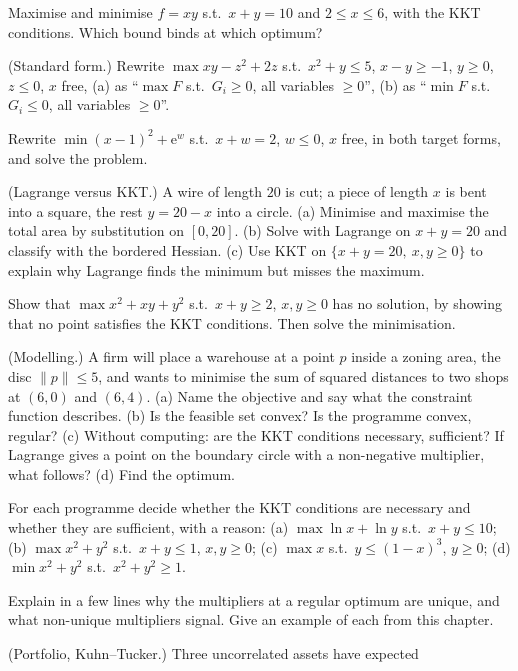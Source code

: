 \begin{problems}
  \item Maximise and minimise $f=xy$ s.t.\ $x+y=10$ and $2\le x\le6$, with
        the KKT conditions. Which bound binds at which optimum?
  \item (Standard form.) Rewrite
        $\max xy-z^{2}+2z$ s.t.\ $x^{2}+y\le5$, $x-y\ge-1$, $y\ge0$,
        $z\le0$, $x$ free, (a) as ``$\max F$ s.t.\ $G_i\ge0$, all variables
        $\ge0$'', (b) as ``$\min F$ s.t.\ $G_i\le0$, all variables $\ge0$''.
  \item Rewrite $\min(x-1)^{2}+\mathrm{e}^{w}$ s.t.\ $x+w=2$, $w\le0$, $x$
        free, in both target forms, and solve the problem.
  \item (Lagrange versus KKT.) A wire of length $20$ is cut; a piece of
        length $x$ is bent into a square, the rest $y=20-x$ into a circle.
        (a) Minimise and maximise the total area by substitution on
        $[0,20]$. (b) Solve with Lagrange on $x+y=20$ and classify with the
        bordered Hessian. (c) Use KKT on $\{x+y=20,\ x,y\ge0\}$ to explain
        why Lagrange finds the minimum but misses the maximum.
  \item Show that $\max x^{2}+xy+y^{2}$ s.t.\ $x+y\ge2$, $x,y\ge0$ has no
        solution, by showing that no point satisfies the KKT conditions.
        Then solve the minimisation.
  \item (Modelling.) A firm will place a warehouse at a point $p$ inside a
        zoning area, the disc $\|p\|\le5$, and wants to minimise the sum of
        squared distances to two shops at $(6,0)$ and $(6,4)$.
        (a) Name the objective and say what the constraint function
        describes. (b) Is the feasible set convex? Is the programme convex,
        regular? (c) Without computing: are the KKT conditions necessary,
        sufficient? If Lagrange gives a point on the boundary circle with a
        non-negative multiplier, what follows? (d) Find the optimum.
  \item For each programme decide whether the KKT conditions are necessary
        and whether they are sufficient, with a reason:
        (a) $\max\ln x+\ln y$ s.t.\ $x+y\le10$;
        (b) $\max x^{2}+y^{2}$ s.t.\ $x+y\le1$, $x,y\ge0$;
        (c) $\max x$ s.t.\ $y\le(1-x)^{3}$, $y\ge0$;
        (d) $\min x^{2}+y^{2}$ s.t.\ $x^{2}+y^{2}\ge1$.
  \item Explain in a few lines why the multipliers at a regular optimum are
        unique, and what non-unique multipliers signal. Give an example of
        each from this chapter.
  \item (Portfolio, Kuhn--Tucker.) Three uncorrelated assets have expected

\end{problems}
